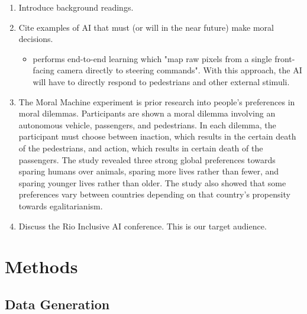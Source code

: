 \documentclass{report}
\begin{document}
\begin{enumerate}
    \item Introduce background readings.
    
    \item Cite examples of AI that must (or will in the near future) make moral decisions.
    \begin{itemize}
        \item \cite{bojarski2016end} performs end-to-end learning which "map raw pixels from a
        single front-facing camera directly to steering commands". With this approach, the AI will
        have to directly respond to pedestrians and other external stimuli.
    \end{itemize}
    
    \item The Moral Machine experiment \cite{awad2018moral} is prior research into people's
    preferences in moral dilemmas. Participants are shown a moral dilemma involving an autonomous
    vehicle, passengers, and pedestrians. In each dilemma, the participant must choose between
    inaction, which results in the certain death of the pedestrians, and action, which results in
    certain death of the passengers. The study revealed three strong global preferences towards
    sparing humans over animals, sparing more lives rather than fewer, and sparing younger lives
    rather than older. The study also showed that some preferences vary between countries depending
    on that country's propensity towards egalitarianism.
    
    \item Discuss the Rio Inclusive AI conference. This is our target audience.
\end{enumerate}

\chapter{Methods}

\section{Data Generation}
\end{document}
